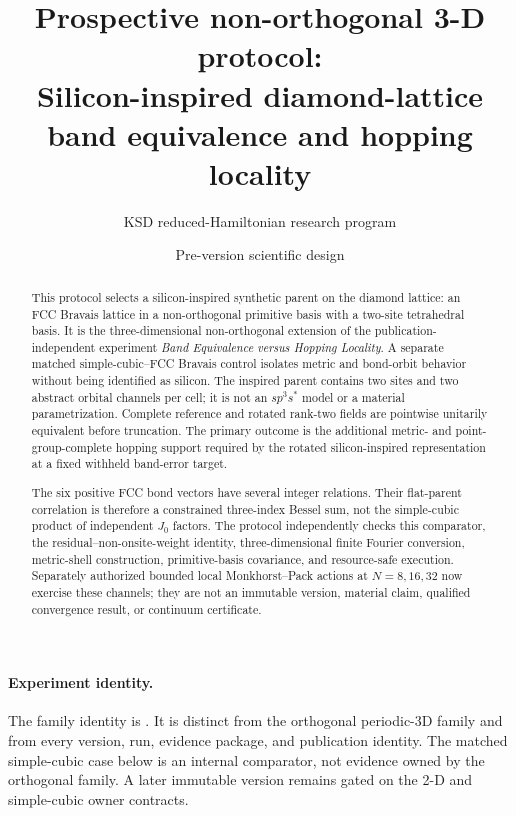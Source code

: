 \documentclass[11pt]{article}
\title{\textbf{Prospective non-orthogonal 3-D protocol:\\
Silicon-inspired diamond-lattice band equivalence and hopping locality}}
\author{KSD reduced-Hamiltonian research program}
\date{Pre-version scientific design}
\begin{document}
\maketitle

\begin{abstract}
This protocol selects a silicon-inspired synthetic parent on the diamond lattice: an
FCC Bravais lattice in a non-orthogonal primitive basis with a two-site tetrahedral
basis.  It is the three-dimensional non-orthogonal extension of the
publication-independent experiment \emph{Band Equivalence versus Hopping Locality}.  A
separate matched simple-cubic--FCC Bravais control isolates metric and bond-orbit
behavior without being identified as silicon.  The inspired parent contains two sites
and two abstract orbital channels per cell; it is not an $sp^3s^*$ model or a material
parametrization.  Complete reference and rotated rank-two fields are pointwise unitarily
equivalent before truncation.  The primary outcome is the additional metric- and
point-group-complete hopping support required by the rotated silicon-inspired
representation at a fixed withheld band-error target.

The six positive FCC bond vectors have several integer relations.  Their flat-parent
correlation is therefore a constrained three-index Bessel sum, not the simple-cubic
product of independent $J_0$ factors.  The protocol independently checks this
comparator, the residual--non-onsite-weight identity, three-dimensional finite Fourier
conversion, metric-shell construction, primitive-basis covariance, and resource-safe
execution.  Separately authorized bounded local Monkhorst--Pack actions at $N=8,16,32$
now exercise these channels; they are not an immutable version, material claim,
qualified convergence result, or continuum certificate.
\end{abstract}

\paragraph{Experiment identity.}
The family identity is
.
It is distinct from the orthogonal periodic-3D family and from every version, run,
evidence package, and publication identity.  The matched simple-cubic case below is an
internal comparator, not evidence owned by the orthogonal family.  A later immutable
version remains gated on the 2-D and simple-cubic owner contracts.
\end{document}
